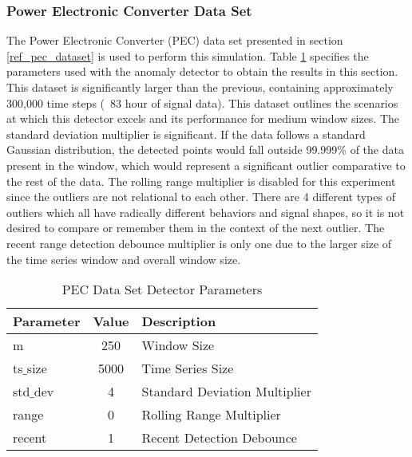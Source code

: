 
\subsubsection{Power Electronic Converter Data Set}
\label{ref_results_pec_sim}
The Power Electronic Converter (PEC) data set presented in section \ref{ref_pec_dataset} is used to perform this simulation. Table \ref{tab:pec_sim_params} specifies the parameters used with the anomaly detector to obtain the results in this section. This dataset is significantly larger than the previous, containing approximately 300,000 time steps (~83 hour of signal data). This dataset outlines the scenarios at which this detector excels and its performance for medium window sizes. The standard deviation multiplier is significant. If the data follows a standard Gaussian distribution, the detected points would fall outside 99.999\% of the data present in the window, which would represent a significant outlier comparative to the rest of the data. The rolling range multiplier is disabled for this experiment since the outliers are not relational to each other. There are 4 different types of outliers which all have radically different behaviors and signal shapes, so it is not desired to compare or remember them in the context of the next outlier. The recent range detection debounce multiplier is only one due to the larger size of the time series window and overall window size.

\begin{table}[H]
\begin{tabular}{|l|c|l|}
    \hline
	\textbf{Parameter} & \textbf{Value} & \textbf{Description} \\ \hline
	m & 250 & Window Size \\ \hline
	ts$\_$size & 5000 & Time Series Size \\ \hline
	std$\_$dev & 4 & Standard Deviation Multiplier \\ \hline
	range & 0 & Rolling Range Multiplier\\ \hline
	recent & 1 & Recent Detection Debounce\\ \hline
\end{tabular}
\caption{PEC Data Set Detector Parameters}
\label{tab:pec_sim_params}
\end{table}

